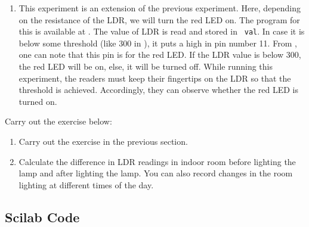 \begin{enumerate}
  \item This experiment is an extension of the previous
        experiment. Here, depending on the resistance of the LDR, we will
        turn the red LED on.  The program for this is available at
        .  The value of LDR is read and stored in {\tt
            val}.  In case it is below some threshold (like 300 in ), 
        it puts a high in pin number 11.  From , 
        one can note that this pin is for the red LED.  If the LDR value is below 300, 
        the red LED will be on, else, it will be turned off.  
        While running this experiment, the readers 
        must keep their fingertips on the LDR so that the threshold is achieved. Accordingly, 
        they can observe whether the red LED is turned on. 
\end{enumerate}

\begin{exercise}
  Carry out the exercise below:
  \begin{enumerate}
    \item Carry out the exercise in the previous section.
    \item Calculate the difference in LDR readings in indoor room
          before lighting the lamp and after lighting the lamp. You can also
          record changes in the room lighting at different times of the day.
  \end{enumerate}
\end{exercise}

\subsection{Scilab Code}
\label{sec:ldr-scilab-code}

